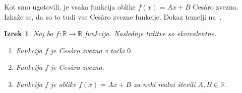 \documentclass[a4paper,12pt]{article}
\theoremstyle{definition}
\theoremstyle{plain}
\newtheorem{izrek}{Izrek}
\begin{document}
Kot smo ugotovili, je vsaka funkcija oblike $f(x) = Ax + B$ Ces\`{a}ro zvezna. Izkaže se, da so to tudi vse Ces\`{a}ro zvezne funkcije. Dokaz temelji na~\cite{2}.

\begin{izrek}
    \label{klaszvez}
    Naj bo $f: \mathbb{R} \rightarrow \mathbb{R}$ funkcija. Naslednje trditve so ekvivalentne.
    \begin{enumerate}
        \item Funkcija $f$ je Ces\`{a}ro zvezna v točki $0$.
        \item Funkcija $f$ je Ces\`{a}ro zvezna.
        \item Funkcija $f$ je oblike $f(x) = Ax + B$ za neki realni števili $A, B \in \mathbb{R}$.
    \end{enumerate}
\end{izrek}
\end{document}
